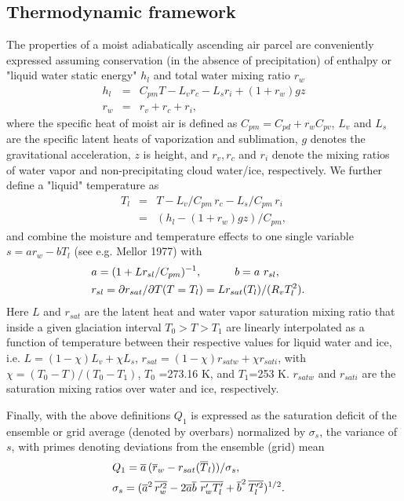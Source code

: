 \subsection{Thermodynamic framework}
The properties of a moist adiabatically ascending air parcel are conveniently
expressed assuming conservation (in the absence of precipitation) of enthalpy
or "liquid water static energy" $h_{l}$  and total
water mixing ratio $r_w$ 
\begin{eqnarray}
h_{l}&=& C_{pm} T - L_v r_c - L_s r_i + ( 1 + r_w ) g z\label{eqh}\\
r_w&=&r_v+r_c+r_i\label{eqr}, 
\end{eqnarray}
where the specific heat of moist air is defined as
$C_{pm}= C_{pd} + r_w C_{pv}$, $L_v$ and $L_s$ are the specific latent heats
of vaporization and sublimation, $g$ denotes the gravitational acceleration,
$z$ is height, and $r_v, r_c$ and $r_i$ denote the mixing ratios of water
vapor and non-precipitating cloud water/ice, respectively.
We further define a "liquid" temperature as
\begin{eqnarray}
T_l & = & T - L_v/C_{pm}\, r_c - L_s/C_{pm}\, r_i \nonumber\\
 & = & (h_{l}- ( 1 + r_w ) g z)/C_{pm}\label{Tl},
\end{eqnarray}
and combine the moisture and temperature effects to one single variable
$s=a r_w - b T_l$ (see e.g. Mellor 1977) with
\begin{eqnarray}
\lefteqn{
a= (1+L r_{sl}/C_{pm})^{-1},\quad\quad\quad b=a\,\, r_{sl},}
\nonumber \\ &
r_{sl}= \partial r_{sat}/\partial T(T=T_l)=L r_{sat}(T_l)/(R_v T_l^2).
\end{eqnarray}
Here $L$ and $r_{sat}$ are the latent heat and water vapor saturation mixing
ratio that inside a given glaciation interval $T_0>T>T_1$ are linearly
interpolated as a function of temperature between their respective values  for
liquid water and ice, i.e. $L=(1-\chi)L_v+\chi L_s$,  $r_{sat}=(1-\chi)r_{satw}+\chi r_{sati}$,
with $\chi=(T_0-T)/(T_0-T_1)$, 
$T_0$ =273.16 K, and $T_1$=253 K. $r_{satw}$ and $r_{sati}$ are the saturation mixing ratios
over water and ice, respectively.

Finally, with the above definitions $Q_1$ is expressed as the saturation 
deficit of the ensemble or grid average (denoted by overbars) normalized by
$\sigma_s$, the variance of $s$,
with primes denoting deviations from the ensemble (grid) mean
\begin{eqnarray}
\lefteqn{ Q_1=\overline{a}\, (\overline{r}_w-r_{sat}(\overline{T}_l))/\sigma_s,
}\nonumber \\ &
\sigma_s=(\overline{a}^2\,\overline{r_w^{\prime 2}}-
2\overline{a}\overline{b}\,\,\overline{r_w^\prime T_l^\prime}+\overline{b}^2 \,
\overline{T_l^{\prime 2}})^{1/2}.
\label{eqq1}
\end{eqnarray}

